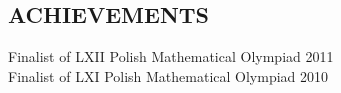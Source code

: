 \documentclass[margin, 10pt]{res} %
\begin{document}
\begin{resume}

\section{ ACHIEVEMENTS } 

Finalist of LXII Polish Mathematical Olympiad \hfill 2011 \\
Finalist of LXI Polish Mathematical Olympiad \hfill 2010





\end{resume}
\end{document}
